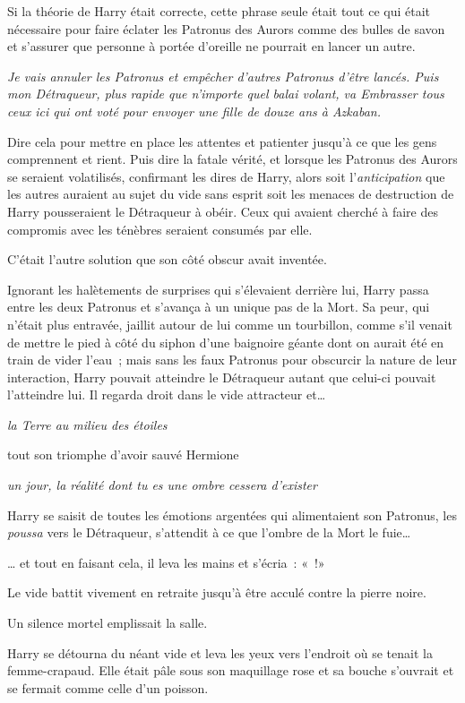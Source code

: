 Si la théorie de Harry était correcte, cette phrase seule était tout ce qui était nécessaire pour faire éclater les Patronus des Aurors comme des bulles de savon et s'assurer que personne à portée d'oreille ne pourrait en lancer un autre.

\emph{Je vais annuler les Patronus et empêcher d'autres Patronus d'être lancés. Puis mon Détraqueur, plus rapide que n'importe quel balai volant, va Embrasser tous ceux ici qui ont voté pour envoyer une fille de douze ans à Azkaban.}

Dire cela pour mettre en place les attentes et patienter jusqu'à ce que les gens comprennent et rient. Puis dire la fatale vérité, et lorsque les Patronus des Aurors se seraient volatilisés, confirmant les dires de Harry, alors soit l'\emph{anticipation} que les autres auraient au sujet du vide sans esprit soit les menaces de destruction de Harry pousseraient le Détraqueur à obéir. Ceux qui avaient cherché à faire des compromis avec les ténèbres seraient consumés par elle.

C'était l'autre solution que son côté obscur avait inventée.

Ignorant les halètements de surprises qui s'élevaient derrière lui, Harry passa entre les deux Patronus et s'avança à un unique pas de la Mort. Sa peur, qui n'était plus entravée, jaillit autour de lui comme un tourbillon, comme s'il venait de mettre le pied à côté du siphon d'une baignoire géante dont on aurait été en train de vider l'eau~; mais sans les faux Patronus pour obscurcir la nature de leur interaction, Harry pouvait atteindre le Détraqueur autant que celui-ci pouvait l'atteindre lui. Il regarda droit dans le vide attracteur et…

\emph{la Terre au milieu des étoiles}

tout son triomphe d'avoir sauvé Hermione

\emph{un jour, la réalité dont tu es une ombre cessera d'exister}

Harry se saisit de toutes les émotions argentées qui alimentaient son Patronus, les \emph{poussa} vers le Détraqueur, s'attendit à ce que l'ombre de la Mort le fuie…

… et tout en faisant cela, il leva les mains et s'écria~: «~!»

Le vide battit vivement en retraite jusqu'à être acculé contre la pierre noire.

Un silence mortel emplissait la salle.

Harry se détourna du néant vide et leva les yeux vers l'endroit où se tenait la femme-crapaud. Elle était pâle sous son maquillage rose et sa bouche s'ouvrait et se fermait comme celle d'un poisson.

